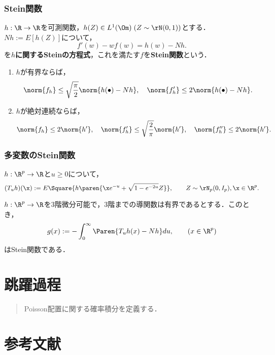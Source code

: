 \documentclass[uplatex,dvipdfmx]{jsreport}
\begin{document}
\subsection{Stein関数}

\begin{definition}
    $h:\R\to\R$を可測関数，$h(Z)\in L^1(\Om)\;(Z\sim\rN(0,1))$とする．
    $Nh:=E[h(Z)]$について，
    \[f'(w)-wf(w)=h(w)-Nh.\]
    を\textbf{$h$に関するSteinの方程式}，これを満たす$f$を\textbf{Stein関数}という．
\end{definition}

\begin{lemma}\mbox{}
    \begin{enumerate}
        \item $h$が有界ならば，
        \[\norm{f_h}\le\sqrt{\frac{\pi}{2}}\norm{h(\bullet)-Nh},\quad\norm{f'_h}\le2\norm{h(\bullet)-Nh}.\]
        \item $h$が絶対連続ならば，
        \[\norm{f_h}\le 2\norm{h'},\quad\norm{f'_h}\le\sqrt{\frac{2}{\pi}}\norm{h'},\quad\norm{f''_h}\le2\norm{h'}.\]
    \end{enumerate}
\end{lemma}

\subsection{多変数のStein関数}

\begin{notation}
    $h:\R^p\to\R$と$u\ge0$について，
    \[(T_uh)(\x):=E\Square{h\paren{\x e^{-u}+\sqrt{1-e^{-2u}}Z}},\qquad Z\sim\rN_p(0,I_p),\x\in\R^p.\]
\end{notation}

\begin{lemma}
    $h:\R^p\to\R$を3階微分可能で，3階までの導関数は有界であるとする．このとき，
    \[g(x):=-\int^\infty_0\Paren{T_uh(x)-Nh}du,\qquad(x\in\R^p)\]
    はStein関数である．
\end{lemma}

\chapter{跳躍過程}

\begin{quotation}
    Poisson配置に関する確率積分を定義する．
\end{quotation}

\chapter{参考文献}
\end{document}
